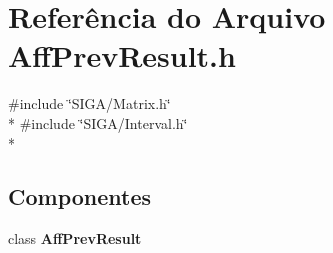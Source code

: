 \section{Referência do Arquivo Aff\+Prev\+Result.\+h}
\label{_aff_prev_result_8h}
{\ttfamily \#include \char`\"{}S\+I\+G\+A/\+Matrix.\+h\char`\"{}}\\*
{\ttfamily \#include \char`\"{}S\+I\+G\+A/\+Interval.\+h\char`\"{}}\\*
\subsection*{Componentes}
\begin{DoxyCompactItemize}
\item 
class {\bf Aff\+Prev\+Result}
\end{DoxyCompactItemize}
